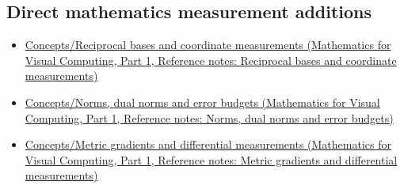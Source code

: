\subsection{Direct mathematics measurement additions}\label{appendix-a6d556a4ef50-direct-mathematics-measurement-additions}

\hypertarget{appendix-a6d556a4ef50-direct-mathematics-measurement-additions}{}

\begin{itemize}
\tightlist
\item
  \href{../02-Mathematics-for-Visual-Computing-P01/main.pdf\#nameddest=appendix-6b3d696dd902}{Concepts/Reciprocal bases and coordinate measurements (Mathematics for Visual Computing, Part 1, Reference notes: Reciprocal bases and coordinate measurements)}
\item
  \href{../02-Mathematics-for-Visual-Computing-P01/main.pdf\#nameddest=appendix-d6d9dbbe3c14}{Concepts/Norms, dual norms and error budgets (Mathematics for Visual Computing, Part 1, Reference notes: Norms, dual norms and error budgets)}
\item
  \href{../02-Mathematics-for-Visual-Computing-P01/main.pdf\#nameddest=appendix-f4acdb1d5563}{Concepts/Metric gradients and differential measurements (Mathematics for Visual Computing, Part 1, Reference notes: Metric gradients and differential measurements)}
\end{itemize}
